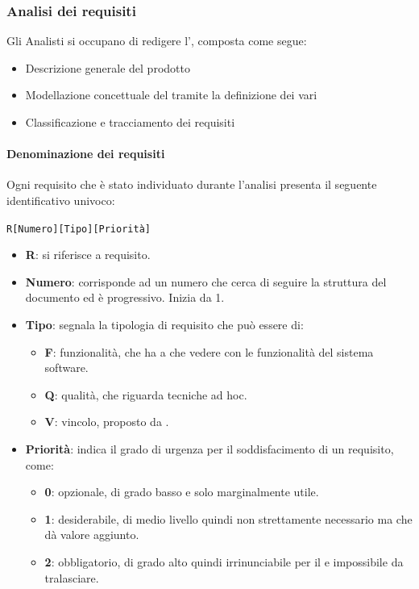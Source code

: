         \subsubsection{Analisi dei requisiti}\label{PP:Sviluppo:AdR}
		Gli Analisti si occupano di redigere l'\Doc{\AdRv}, composta come segue:
		\begin{itemize}
			\item Descrizione generale del prodotto
			\item Modellazione concettuale del  tramite la definizione dei vari 
			\item Classificazione e tracciamento dei requisiti
		\end{itemize}

		\paragraph{Denominazione dei requisiti}\label{PP:Sviluppo:AdR:DenominazioneRequisiti}
		Ogni requisito che è stato individuato durante l'analisi presenta il seguente identificativo univoco:
		\begin{center}
			\texttt{R[Numero][Tipo][Priorità]}
		\end{center}

		\begin{itemize}
			\item \textbf{R}: si riferisce a requisito.
		 	\item \textbf{Numero}: corrisponde ad un numero che cerca di seguire la struttura del documento ed è progressivo. Inizia da 1.
		 	\item \textbf{Tipo}: segnala la tipologia di requisito che può essere di:
		 	\begin{itemize}
		 		\item \textbf{F}: funzionalità, che ha a che vedere con le funzionalità del sistema software.
		 		\item \textbf{Q}: qualità, che riguarda tecniche ad hoc.
		 		\item \textbf{V}: vincolo, proposto da \II.
		 	\end{itemize}
	 		\item \textbf{Priorità}: indica il grado di urgenza per il soddisfacimento di un requisito, come:
	 		\begin{itemize}
	 			\item \textbf{0}: opzionale, di grado basso e solo marginalmente utile.
	 			\item \textbf{1}: desiderabile, di medio livello quindi non strettamente necessario ma che dà valore aggiunto.
	 			\item \textbf{2}: obbligatorio, di grado alto quindi irrinunciabile per il  e impossibile da tralasciare.
	 		\end{itemize}
		\end{itemize}

